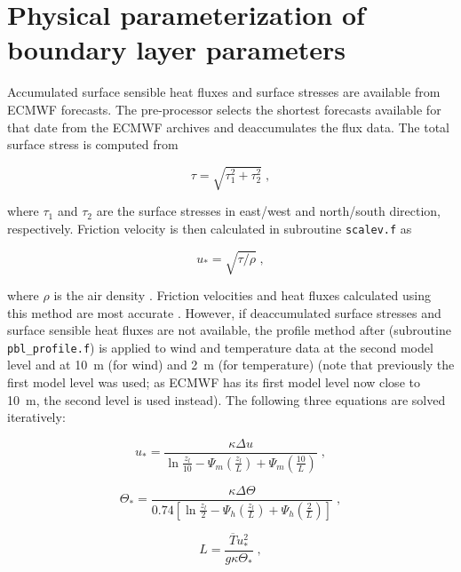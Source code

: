 \documentclass{egu}                  %
\begin{document}
\section[Physical parameterizations]{Physical parameterization of boundary layer parameters}

\label{PBLparameterization} Accumulated surface sensible heat fluxes and
surface stresses are available from ECMWF forecasts.  The pre-processor selects
the shortest forecasts available for that date from the ECMWF archives and
deaccumulates the flux data.  The total surface stress is computed from

\begin{equation}
\tau=\sqrt{\tau_1^2+\tau_2^2} \;,
\end{equation}

where $\tau_1$ and $\tau_2$ are the surface stresses in east/west and
north/south direction, respectively.  Friction velocity is then calculated in
subroutine \verb|scalev.f| as

\begin{equation}
u_*=\sqrt{\tau/\rho} \;,
\end{equation}

where $\rho$ is the air density \citep{wotawa1996}.  Friction velocities and
heat fluxes calculated using this method are most accurate \citep{wotawa1997}.
However, if deaccumulated surface stresses and surface sensible heat fluxes are
not available, the profile method after \citet{berkowicz1982} (subroutine
\verb|pbl_profile.f|) is applied to wind and temperature data at the second
model level and at 10~m (for wind) and 2~m (for temperature) (note that
previously the first model level was used; as ECMWF has its first model level
now close to 10~m, the second level is used instead).  The following three
equations are solved iteratively:

\begin{equation}
u_*=\frac{\kappa\Delta u}{\ln {\frac{z_l}{10}} -\Psi_m(\frac{z_l}{L}) +\Psi_m(\frac{10}{L})} \; ,
\end{equation}

\begin{equation}
\Theta_*=\frac{\kappa\Delta \Theta}{0.74 \left[{\ln {\frac{z_l}{2}} -\Psi_h(\frac{z_l}{L}) +\Psi_h(\frac{2}{L})}\right]} \; ,
\end{equation}

\begin{equation}
L= \frac{\overline{T}u_*^2}{g \kappa \Theta_*} \;,
\end{equation}
\end{document}
